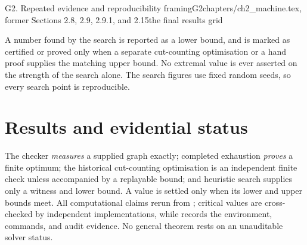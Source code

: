 \begin{offcutrewrite}{G2. Repeated evidence and reproducibility framing}{G2}{chapters/ch2\_machine.tex, former Sections 2.8, 2.9, 2.9.1, and 2.15}{the final results grid}
\begin{computernote}[Honesty]
A number found by the search is reported as a lower bound, and is marked as certified or proved only when a separate cut-counting optimisation or a hand proof supplies the matching upper bound. No extremal value is ever asserted on the strength of the search alone. The search figures use fixed random seeds, so every search point is reproducible.
\end{computernote}
\nowreads
\section{Results and evidential status}

The checker \emph{measures} a supplied graph exactly; completed exhaustion \emph{proves} a finite optimum; the historical cut-counting optimisation is an independent finite check unless accompanied by a replayable bound; and heuristic search supplies only a witness and lower bound. A value is settled only when its lower and upper bounds meet. All computational claims rerun from ; critical values are cross-checked by independent implementations, while  records the environment, commands, and audit evidence. No general theorem rests on an unauditable solver status.
\end{offcutrewrite}

